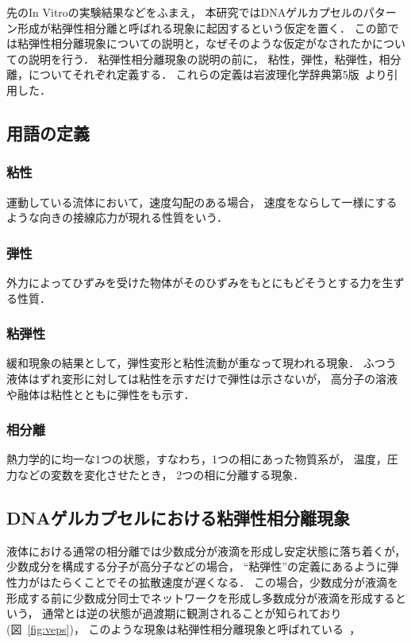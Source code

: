 先のIn Vitroの実験結果などをふまえ，
本研究ではDNAゲルカプセルのパターン形成が粘弾性相分離と呼ばれる現象に起因するという仮定を置く．
この節では粘弾性相分離現象についての説明と，なぜそのような仮定がなされたかについての説明を行う．
粘弾性相分離現象の説明の前に，
粘性，弾性，粘弾性，相分離，についてそれぞれ定義する．
これらの定義は岩波理化学辞典第5版~\cite{rikagakuiwanami}より引用した．

\subsection{用語の定義}

\subsubsection{粘性}
運動している流体において，速度勾配のある場合，
速度をならして一様にするような向きの接線応力が現れる性質をいう．

\subsubsection{弾性}
外力によってひずみを受けた物体がそのひずみをもとにもどそうとする力を生ずる性質．

\subsubsection{粘弾性}
緩和現象の結果として，弾性変形と粘性流動が重なって現われる現象．
ふつう液体はずれ変形に対しては粘性を示すだけで弾性は示さないが，
高分子の溶液や融体は粘性とともに弾性をも示す．

\subsubsection{相分離}
熱力学的に均一な1つの状態，すなわち，1つの相にあった物質系が，
温度，圧力などの変数を変化させたとき，
2つの相に分離する現象．

\subsection{DNAゲルカプセルにおける粘弾性相分離現象}
液体における通常の相分離では少数成分が液滴を形成し安定状態に落ち着くが，
少数成分を構成する分子が高分子などの場合，
``粘弾性''の定義にあるように弾性力がはたらくことでその拡散速度が遅くなる．
この場合，少数成分が液滴を形成する前に少数成分同士でネットワークを形成し多数成分が液滴を形成するという，
通常とは逆の状態が過渡期に観測されることが知られており(図~\ref{fig:veps})，
このような現象は粘弾性相分離現象と呼ばれている~\cite{tanaka2009formation}，

